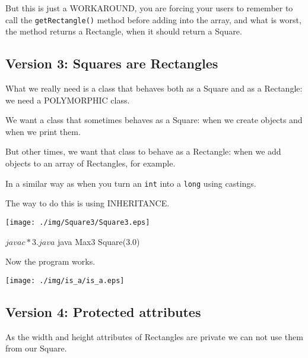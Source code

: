 \documentclass[a4paper, 9pt]{extarticle}
\begin{document}
But this is just a WORKAROUND, you are forcing your users to remember to call
the \verb+getRectangle()+ method before adding into the array, and what is
worst, the method returns a Rectangle, when it should return a Square.



\newpage
\subsection{Version 3: Squares are Rectangles}

What we really need is a class that behaves both as a Square and as a
Rectangle: we need a POLYMORPHIC class.

We want a class that sometimes behaves as a Square: when we create objects
and when we print them.

But other times, we want that class to behave as a Rectangle: when we add
objects to an array of Rectangles, for example.

In a similar way as when you turn an \verb+int+ into a \verb+long+ using
castings.

The way to do this is using INHERITANCE.

\begin{multicols}{2}
  \begin{center}
    \texttt{[image: ./img/Square3/Square3.eps]}
  \end{center}
\columnbreak
\end{multicols}

\begin{blackboard}
$ javac *3.java
$ java Max3
Square(3.0)
\end{blackboard}

Now the program works.

\begin{center}
  \texttt{[image: ./img/is\_a/is\_a.eps]}
\end{center}






\newpage

\subsection{Version 4: Protected attributes}

As the width and height attributes of Rectangles are private we can not use
them from our Square.
\end{document}
